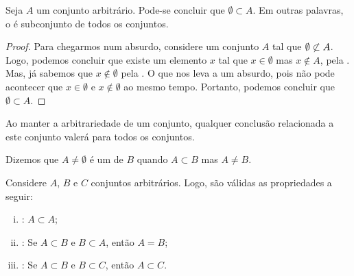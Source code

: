 \begin{proposition}
\label{prop:emptyset1}
Seja $A$ um conjunto arbitrário. Pode-se concluir que $\emptyset \subset A$.
Em outras palavras, o  é subconjunto de todos os conjuntos.
\end{proposition}

\begin{proof}
Para chegarmos num absurdo, considere um conjunto $A$ tal que $\emptyset \not\subset A$.
Logo, podemos concluir que existe um elemento $x$ tal que $x \in \emptyset$ mas $x \notin A$, pela .
Mas, já sabemos que $x \notin \emptyset$ pela .
O que nos leva a um absurdo, pois não pode acontecer que $x \in \emptyset$ e $x \notin \emptyset$ ao mesmo tempo.
Portanto, podemos concluir que $\emptyset \subset A$.
\end{proof}

\begin{remark}
Ao manter a arbitrariedade de um conjunto, qualquer conclusão relacionada a este conjunto valerá para todos os conjuntos.
\end{remark}

\begin{definition}
Dizemos que $A \ne \emptyset$ é um  de $B$ quando $A \subset B$ mas $A \neq B$.
\end{definition}

\begin{proposition}
Considere $A$, $B$ e $C$ conjuntos arbitrários. Logo, são válidas as propriedades a seguir:

\begin{enumerate}[i)]
\item
	\label{inclusao:reflexividade}
	: $A \subset A$;
\item
	\label{inclusao:antissimetria}
	: Se $A \subset B$ e $B \subset A$, então $A = B$;
\item
	\label{inclusao:transitividade}
	: Se $A \subset B$ e $B \subset C$, então $A \subset C$.
\end{enumerate}
\end{proposition}

